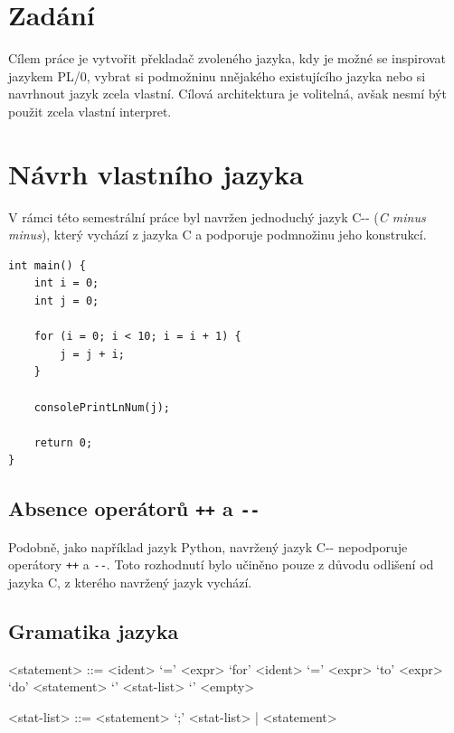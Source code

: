 \documentclass[12pt, a4paper]{article}
\let\oldsection\section
\renewcommand\section{\clearpage\oldsection}
\begin{document}
    \tableofcontents
    \pagebreak

    
\section{Zadání}

    Cílem práce je vytvořit překladač zvoleného jazyka, kdy je možné se inspirovat jazykem PL/0, vybrat si podmožninu nnějakého existujícího jazyka nebo si navrhnout jazyk zcela vlastní. Cílová architektura je volitelná, avšak nesmí být použit zcela vlastní interpret.


\section{Návrh vlastního jazyka}

V rámci této semestrální práce byl navržen jednoduchý jazyk C-{}- (\textit{C minus minus}), který vychází z jazyka C a podporuje podmnožinu jeho konstrukcí.

\begin{lstlisting}[caption={Ukázka programu v jazyce C-{}-}, captionpos=b]
int main() {
    int i = 0;
    int j = 0;

    for (i = 0; i < 10; i = i + 1) {
        j = j + i;
    }

    consolePrintLnNum(j);

    return 0;
}
\end{lstlisting}


\subsection{Absence operátorů \texttt{++} a \texttt{-{}-}}

Podobně, jako například jazyk Python, navržený jazyk C-{}- nepodporuje operátory \texttt{++} a \texttt{-{}-}. Toto rozhodnutí bylo učiněno pouze z důvodu odlišení od jazyka C, z kterého navržený jazyk vychází.

\subsection{Gramatika jazyka}
\begin{grammar}

<statement> ::= <ident> `=' <expr> 
\alt `for' <ident> `=' <expr> `to' <expr> `do' <statement> 
\alt `{' <stat-list> `}' 
\alt <empty> 

<stat-list> ::= <statement> `;' <stat-list> | <statement> 

\end{grammar}
\end{document}
